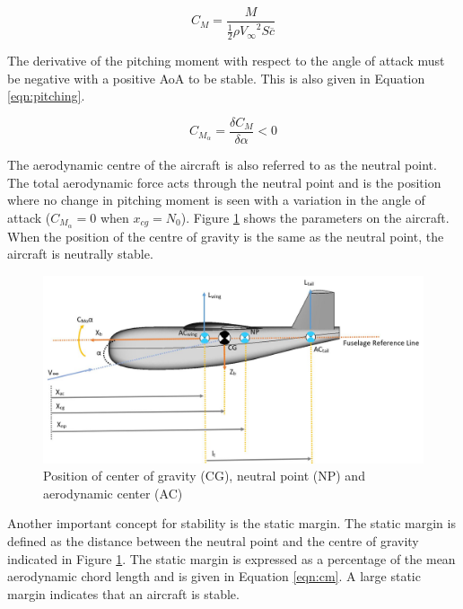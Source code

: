 \begin{equation}
    C_M = \frac{M}{\frac{1}{2}\rho {V_\infty}^2 S \overline{c}}
    \label{eqn:yoyo}
\end{equation}

The derivative of the pitching moment with respect to the angle of attack must be negative with a positive \acrshort{AoA} to be stable. This is also given in Equation \ref{eqn:pitching}.

\begin{equation}
    C_{M_\alpha} = \frac{\delta C_M}{\delta \alpha} < 0 
    \label{eqn:pitching}
\end{equation}

The aerodynamic centre of the aircraft is also referred to as the neutral point. The total aerodynamic force acts through the neutral point and is the position where no change in pitching moment is seen with a variation in the angle of attack ($C_{M_\alpha} = 0$ when $x_{cg} = N_0$). Figure \ref{fig:AC} shows the parameters on the aircraft. When the position of the centre of gravity is the same as the neutral point, the aircraft is neutrally stable. 

\begin{figure}[H]
  \centering
   \includegraphics[width=1\linewidth]{03_LiteratureReview/Figs/CGNPAC.JPG}
  \caption{Position of center of gravity (\acrshort{CG}), neutral point (\acrshort{NP}) and aerodynamic center (\acrshort{AC})}
  \label{fig:AC}
\end{figure}

Another important concept for stability is the static margin. The static margin is defined as the distance between the neutral point and the centre of gravity indicated in Figure \ref{fig:AC}. The static margin is expressed as a percentage of the mean aerodynamic chord length and is given in Equation \ref{eqn:cm}. A large static margin indicates that an aircraft is stable. 

